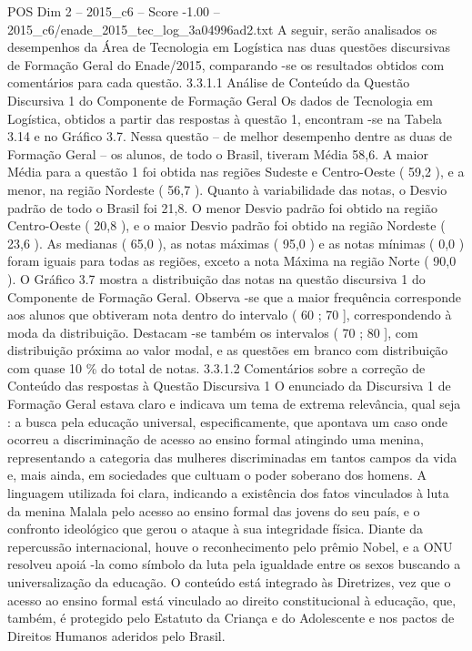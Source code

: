 \begin{textsample}{POS Dim 2 – 2015\_c6 – Score -1.00 – 2015\_c6/enade\_2015\_tec\_log\_3a04996ad2.txt}
A seguir, serão analisados os desempenhos da Área de Tecnologia em Logística nas duas questões discursivas de Formação Geral do Enade/2015, comparando -se os resultados obtidos com comentários para cada questão. 3.3.1.1 Análise de Conteúdo da Questão Discursiva 1 do Componente de Formação Geral Os dados de Tecnologia em Logística, obtidos a partir das respostas à questão 1, encontram -se na Tabela 3.14 e no Gráfico 3.7.
Nessa questão – de melhor desempenho dentre as duas de Formação Geral – os alunos, de todo o Brasil, tiveram Média 58,6.
A maior Média para a questão 1 foi obtida nas regiões Sudeste e Centro-Oeste ( 59,2 ), e a menor, na região Nordeste ( 56,7 ).
Quanto à variabilidade das notas, o Desvio padrão de todo o Brasil foi 21,8.
O menor Desvio padrão foi obtido na região Centro-Oeste ( 20,8 ), e o maior Desvio padrão foi obtido na região Nordeste ( 23,6 ).
As medianas ( 65,0 ), as notas máximas ( 95,0 ) e as notas mínimas ( 0,0 ) foram iguais para todas as regiões, exceto a nota Máxima na região Norte ( 90,0 ).
O Gráfico 3.7 mostra a distribuição das notas na questão discursiva 1 do Componente de Formação Geral.
Observa -se que a maior frequência corresponde aos alunos que obtiveram nota dentro do intervalo ( 60 ; 70 ], correspondendo à moda da distribuição.
Destacam -se também os intervalos ( 70 ; 80 ], com distribuição próxima ao valor modal, e as questões em branco com distribuição com quase 10 \% do total de notas. 3.3.1.2 Comentários sobre a correção de Conteúdo das respostas à Questão Discursiva 1 O enunciado da Discursiva 1 de Formação Geral estava claro e indicava um tema de extrema relevância, qual seja : a busca pela educação universal, especificamente, que apontava um caso onde ocorreu a discriminação de acesso ao ensino formal atingindo uma menina, representando a categoria das mulheres discriminadas em tantos campos da vida e, mais ainda, em sociedades que cultuam o poder soberano dos homens.
A linguagem utilizada foi clara, indicando a existência dos fatos vinculados à luta da menina Malala pelo acesso ao ensino formal das jovens do seu país, e o confronto ideológico que gerou o ataque à sua integridade física.
Diante da repercussão internacional, houve o reconhecimento pelo prêmio Nobel, e a ONU resolveu apoiá -la como símbolo da luta pela igualdade entre os sexos buscando a universalização da educação.
O conteúdo está integrado às Diretrizes, vez que o acesso ao ensino formal está vinculado ao direito constitucional à educação, que, também, é protegido pelo Estatuto da Criança e do Adolescente e nos pactos de Direitos Humanos aderidos pelo Brasil.

\end{textsample}
